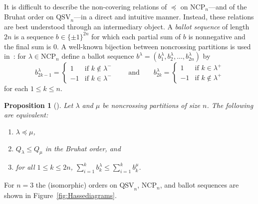 \documentclass[12pt]{amsart}
\newtheorem{prop}[equation]{Proposition}
\theoremstyle{definition}
\theoremstyle{remark}
\numberwithin{equation}{section}
\newcommand{\QSV}{\mathrm{QSV}}
\newcommand{\NCP}{\mathrm{NCP}}
\begin{document}
It is difficult to describe the non-covering relations of $\preceq$ on $\NCP_{n}$---and of the Bruhat order on $\QSV_{n}$---in a direct and intuitive manner.  Instead, these relations are best understood through an intermediary object.  A \emph{ballot sequence} of length $2n$ is a sequence $b \in \{\pm1\}^{2n}$ for which each partial sum of $b$ is nonnegative and the final sum is $0$.  A well-known bijection between noncrossing partitions is used in~\cite[Section~5.1]{GobetWilliams}: for $\lambda \in \NCP_{n}$ define a ballot sequence $b^{\lambda} = (b^{\lambda}_{1}, b^{\lambda}_{2}, \ldots, b^{\lambda}_{2n})$  by
\[
b^{\lambda}_{2 k - 1} = \begin{cases} 1 & \text{if $k \notin \lambda^{-}$} \\ -1 & \text{if $k \in \lambda^{-}$} \end{cases}
\qquad
\text{and}
\qquad
b^{\lambda}_{2 k} = \begin{cases} 1 & \text{if $k \in \lambda^{+}$} \\ -1 & \text{if $k \notin \lambda^{+}$} \end{cases}
\]
for each $1 \le k \le n$.

\begin{prop}[{\cite[Theorem 1.1 and Corollary 7.5]{GobetWilliams}}]
\label{prop:QSVorderbijection}
Let $\lambda$ and $\mu$ be noncrossing partitions of size $n$.  The following are equivalent:
\begin{enumerate}[itemsep =1ex]
\item $\lambda \preceq \mu$, 

\item $Q_{\lambda} \le Q_{\mu}$ in the Bruhat order, and

\item for all $1 \le k \le 2n$, $\sum_{i = 1}^{k} b^{\lambda}_{k} \le \sum_{i = 1}^{k} b^{\mu}_{k}$.

\end{enumerate}
\end{prop}

For $n = 3$ the (isomorphic) orders on $\QSV_{n}$, $\NCP_{n}$, and ballot sequences are shown in Figure~\ref{fig:Hassediagrams}.
\end{document}
